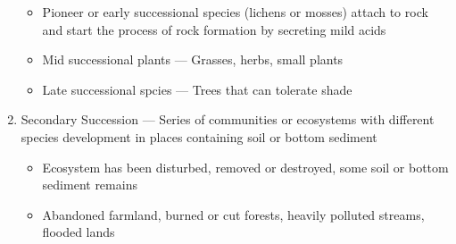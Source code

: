 \documentclass[12pt]{article}
\begin{document}
\begin{enumerate}
\begin{itemize}
      \item Pioneer or early successional species (lichens or mosses) attach to rock and start the process of rock formation by secreting mild acids

      \item Mid successional plants — Grasses, herbs, small plants

      \item Late successional spcies — Trees that can tolerate shade

    \end{itemize}

  \item Secondary Succession — Series of communities or ecosystems with different species development in places containing soil or bottom sediment

    \begin{itemize}

      \item Ecosystem has been disturbed, removed or destroyed, some soil or bottom sediment remains

      \item Abandoned farmland, burned or cut forests, heavily polluted streams, flooded lands

    \end{itemize}

\end{enumerate}
\end{document}
